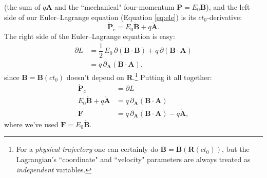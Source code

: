 \documentclass[12pt]{article}
\renewcommand{\vv}[1]{\mathbf{#1}}
\begin{document}
(the sum of $q \vv A$ and the ``mechanical" four-momentum $\vv P = E_0 \vv B$), and the left side of our Euler--Lagrange equation (Equation \ref{eq:ele}) is its $ct_0$-derivative:
\begin{equation*}
\mathring{\vv P}_\textrm{c}  =  E_0 \mathring{\vv B} + q \mathring{\vv A} .
\end{equation*}
The right side of the Euler--Lagrange equation is easy:
\begin{equation*}
\begin{split}
\partialup L &= \dfrac{1}{2} \, E_0 \, \partialup (\vv B \cdot \vv B) + q \, \partialup (\vv B \cdot \vv A) \\[2pt]
&= q \, \partialup_{\vv A} (\vv B \cdot \vv A),
\end{split}
\end{equation*}
since $\vv B = \vv B(ct_0)$ doesn't depend on $\vv R$.\footnote{For a \emph{physical trajectory} one can certainly do $\vv B = \vv B (\vv R (ct_0))$, but the Lagrangian's ``coordinate" and ``velocity" parameters are always treated as \emph{independent} variables.} Putting it all together:
\begin{equation}\label{eq:emeom}
\begin{split}
\mathring{\vv P}_\textrm{c} &= \partialup L \\[2pt]
E_0 \mathring{\vv B} + q \mathring{\vv A} &= q \, \partialup_{\vv A} (\vv B \cdot \vv A) \\[3pt]
\vv F &= q \, \partialup_{\vv A} (\vv B \cdot \vv A) - q \mathring{\vv A} ,
\end{split}
\end{equation}
where we've used $\vv F = E_0 \mathring{\vv B}$.
\end{document}
